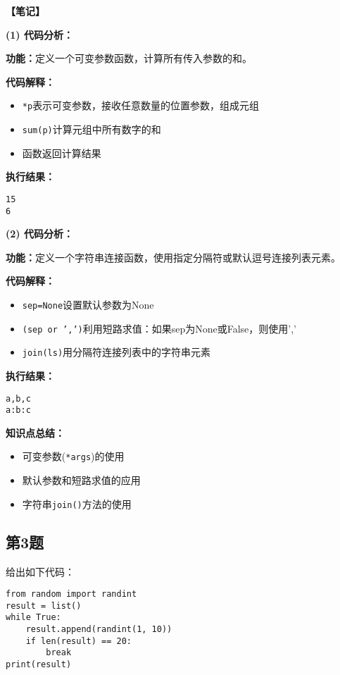 \begin{mdframed}[linewidth=1pt, linecolor=black]

  \textbf{\color{red}【笔记】}

  \textbf{(1) 代码分析：}

  \textbf{功能：}定义一个可变参数函数，计算所有传入参数的和。

  \textbf{代码解释：}
  \begin{itemize}
    \item \texttt{*p}表示可变参数，接收任意数量的位置参数，组成元组
    \item \texttt{sum(p)}计算元组中所有数字的和
    \item 函数返回计算结果
  \end{itemize}

  \textbf{执行结果：}
  \begin{lstlisting}
15
6
  \end{lstlisting}

  \textbf{(2) 代码分析：}

  \textbf{功能：}定义一个字符串连接函数，使用指定分隔符或默认逗号连接列表元素。

  \textbf{代码解释：}
  \begin{itemize}
    \item \texttt{sep=None}设置默认参数为None
    \item \texttt{(sep or ',')}利用短路求值：如果sep为None或False，则使用','
    \item \texttt{join(ls)}用分隔符连接列表中的字符串元素
  \end{itemize}

  \textbf{执行结果：}
  \begin{lstlisting}
a,b,c
a:b:c
  \end{lstlisting}

  \textbf{知识点总结：}
  \begin{itemize}
    \item 可变参数(\texttt{*args})的使用
    \item 默认参数和短路求值的应用
    \item 字符串\texttt{join()}方法的使用
  \end{itemize}

\end{mdframed}

\subsection{第3题}
给出如下代码：
\begin{lstlisting}
from random import randint
result = list()
while True:
    result.append(randint(1, 10))
    if len(result) == 20:
        break
print(result)
\end{lstlisting}

